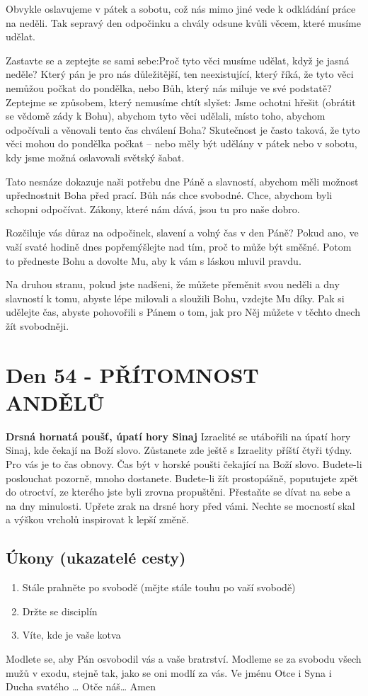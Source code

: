 \documentclass[11pt]{article}
\newcommand{\zacatekOsmyTyden}{
  \textbf{Drsná hornatá poušť, úpatí hory Sinaj} \newline 
  Izraelité se utábořili na úpatí hory Sinaj, kde čekají na Boží slovo. Zůstanete zde ještě s Izraelity příští čtyři týdny. Pro vás je to čas obnovy. Čas být v horské poušti čekající na Boží slovo. Budete-li poslouchat pozorně, mnoho dostanete. Budete-li žít prostopášně, poputujete zpět do otroctví, ze kterého jste byli zrovna propuštěni. Přestaňte se dívat na sebe a na dny minulosti. Upřete zrak na drsné hory před vámi. Nechte se mocností skal a výškou vrcholů inspirovat k lepší změně.
  \subsection*{Úkony (ukazatelé cesty)}
\begin{enumerate}
  \item Stále prahněte po svobodě (mějte stále touhu po vaší svobodě)
  \item Držte se disciplín
  \item Víte, kde je vaše kotva
\end{enumerate}
Modlete se, aby Pán osvobodil vás a vaše bratrství. \newline
Modleme se za svobodu všech mužů v exodu, stejně tak, jako se oni modlí za vás.\newline
Ve jménu Otce i Syna i Ducha svatého …  Otče náš… Amen
}
\begin{document}
Obvykle oslavujeme v pátek a sobotu, což nás mimo jiné vede k odkládání práce na neděli. Tak sepravý den
odpočinku a chvály odsune kvůli věcem, které musíme udělat.

Zastavte se a zeptejte se sami sebe:Proč tyto věci musíme udělat, když je jasná neděle? Který pán je pro nás
důležitější, ten neexistující, který říká, že tyto věci nemůžou počkat do pondělka, nebo Bůh, který nás miluje
ve své podstatě? Zeptejme se způsobem, který nemusíme chtít slyšet: Jsme ochotni hřešit (obrátit se vědomě
zády k Bohu), abychom tyto věci udělali, místo toho, abychom odpočívali a věnovali tento čas chválení
Boha? Skutečnost je často taková, že tyto věci mohou do pondělka počkat – nebo měly být udělány v pátek
nebo v sobotu, kdy jsme možná oslavovali světský šabat.

Tato nesnáze dokazuje naši potřebu dne Páně a slavností, abychom měli možnost upřednostnit Boha před
prací. Bůh nás chce svobodné. Chce, abychom byli schopni odpočívat. Zákony, které nám dává, jsou tu pro
naše dobro.

Rozčiluje vás důraz na odpočinek, slavení a volný čas v den Páně? Pokud ano, ve vaší svaté hodině dnes
popřemýšlejte nad tím, proč to může být směšné. Potom to předneste Bohu a dovolte Mu, aby k vám s láskou
mluvil pravdu.

Na druhou stranu, pokud jste nadšeni, že můžete přeměnit svou neděli a dny slavností k tomu, abyste lépe
milovali a sloužili Bohu, vzdejte Mu díky. Pak si udělejte čas, abyste pohovořili s Pánem o tom, jak pro Něj
můžete v těchto dnech žít svobodněji.

\newpage
\section{Den 54 - PŘÍTOMNOST ANDĚLŮ  }
\zacatekOsmyTyden
\end{document}
